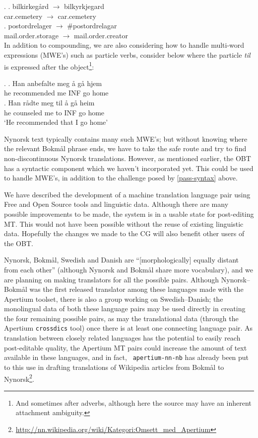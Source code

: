 \documentclass[11pt]{article}
\newcommand{\comment}[1]{\textbf{SKRIV} {\it #1}}
\renewcommand{\comment}[1]{}
\begin{document}
\ex. \ag. bilkirkegård $\rightarrow$ bilkyrkjegard\\
car.cemetery $\rightarrow$ car.cemetery\\
\bg. postordrelager $\rightarrow$ \#postordrelagar\\
mail.order.storage $\rightarrow$ mail.order.creator\\

In addition to compounding, we are also considering how to handle
multi-word expressions (MWE's) such as particle verbs, consider \Next below
where the particle \emph{til} is expressed after the
object\footnote{And sometimes after adverbs, although here the source
  may have an inherent attachment ambiguity.}:

\ex. \ag. Han anbefalte meg å gå hjem\\
he recommended me INF go home\\
\bg. Han rådte meg til å gå heim\\
he counseled me to INF go home\\
`He recommended that I go home'

Nynorsk text typically contains many such MWE's; but without knowing
where the relevant Bokmål phrase ends, we have to take the safe route
and try to find non-discontinuous Nynorsk translations. However, as
mentioned earlier, the OBT has a syntactic component which we haven't
incorporated yet. This could be used to handle MWE's, in addition to
the challenge posed by \ref{pass-syntax} above.

\comment{ noko om at nn-nb.po kan nyttast som TMX med Apertium?}

We have described the development of a machine translation language
pair using Free and Open Source tools and linguistic data. Although
there are many possible improvements to be made, the system is in a
usable state for post-editing MT. This would not have been possible
without the reuse of existing linguistic data. Hopefully the changes
we made to the CG will also benefit other users of the OBT.

Nynorsk, Bokmål, Swedish and Danish are ``[morphologically] equally
distant from each other'' \citep[p.~1]{everson2000sln} (although
Nynorsk and Bokmål share more vocabulary), and we are planning on
making translators for all the possible pairs.  Although
Nynorsk–Bokmål was the first released translator among these languages
made with the Apertium toolset, there is also a group working on
Swedish–Danish; the monolingual data of both these language pairs may
be used directly in creating the four remaining possible pairs, as may
the translational data (through the Apertium {\tt crossdics} tool)
once there is at least one connecting language pair. As translation
between closely related languages has the potential to easily reach
post-editable quality, the Apertium MT pairs could increase the amount
of text available in these languages, and in fact, {\tt
  apertium-nn-nb} has already been put to this use in drafting
translations of Wikipedia articles from Bokmål to Nynorsk\footnote{\href{http://nn.wikipedia.org/wiki/Kategori:Omsett_med_Apertium}{http://nn.wikipedia.org/wiki/Kategori:Omsett_med_Apertium}}.
\end{document}
